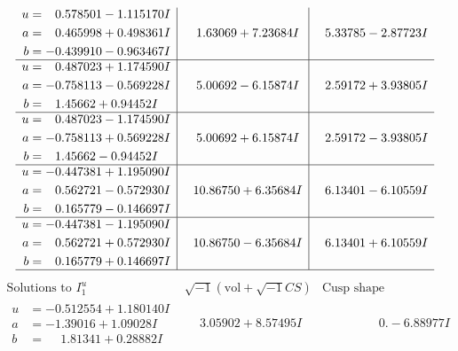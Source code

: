 \documentclass[1p]{elsarticle_modified}
\theoremstyle{definition}
\newcommand{\I}{\sqrt{-1}}
\begin{document}
$$\begin{array}{c|c|c}
\begin{aligned}
u &= \phantom{-}0.578501 - 1.115170 I \\
a &= \phantom{-}0.465998 + 0.498361 I \\
b &= -0.439910 - 0.963467 I\end{aligned}
 & \phantom{-}1.63069 + 7.23684 I & \phantom{-}5.33785 - 2.87723 I \\ \hline\begin{aligned}
u &= \phantom{-}0.487023 + 1.174590 I \\
a &= -0.758113 - 0.569228 I \\
b &= \phantom{-}1.45662 + 0.94452 I\end{aligned}
 & \phantom{-}5.00692 - 6.15874 I & \phantom{-}2.59172 + 3.93805 I \\ \hline\begin{aligned}
u &= \phantom{-}0.487023 - 1.174590 I \\
a &= -0.758113 + 0.569228 I \\
b &= \phantom{-}1.45662 - 0.94452 I\end{aligned}
 & \phantom{-}5.00692 + 6.15874 I & \phantom{-}2.59172 - 3.93805 I \\ \hline\begin{aligned}
u &= -0.447381 + 1.195090 I \\
a &= \phantom{-}0.562721 - 0.572930 I \\
b &= \phantom{-}0.165779 - 0.146697 I\end{aligned}
 & \phantom{-}10.86750 + 6.35684 I & \phantom{-}6.13401 - 6.10559 I \\ \hline\begin{aligned}
u &= -0.447381 - 1.195090 I \\
a &= \phantom{-}0.562721 + 0.572930 I \\
b &= \phantom{-}0.165779 + 0.146697 I\end{aligned}
 & \phantom{-}10.86750 - 6.35684 I & \phantom{-}6.13401 + 6.10559 I\\
 \hline 
 \end{array}$$\newpage$$\begin{array}{c|c|c}  
\text{Solutions to }I^u_{1}& \I (\text{vol} + \sqrt{-1}CS) & \text{Cusp shape}\\
 \hline 
\begin{aligned}
u &= -0.512554 + 1.180140 I \\
a &= -1.39016 + 1.09028 I \\
b &= \phantom{-}1.81341 + 0.28882 I\end{aligned}
 & \phantom{-}3.05902 + 8.57495 I & \phantom{-0.000000 } 0. - 6.88977 I \\ \hline\begin{aligned}

\end{aligned}
\end{array}$$
\end{document}
